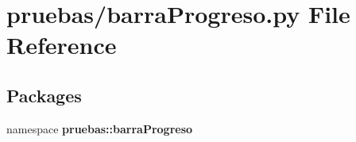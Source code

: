 \section{pruebas/barra\-Progreso.py \-File \-Reference}
\label{barra_progreso_8py}
\subsection*{\-Packages}
\begin{DoxyCompactItemize}
\item 
namespace {\bf pruebas\-::barra\-Progreso}
\end{DoxyCompactItemize}
